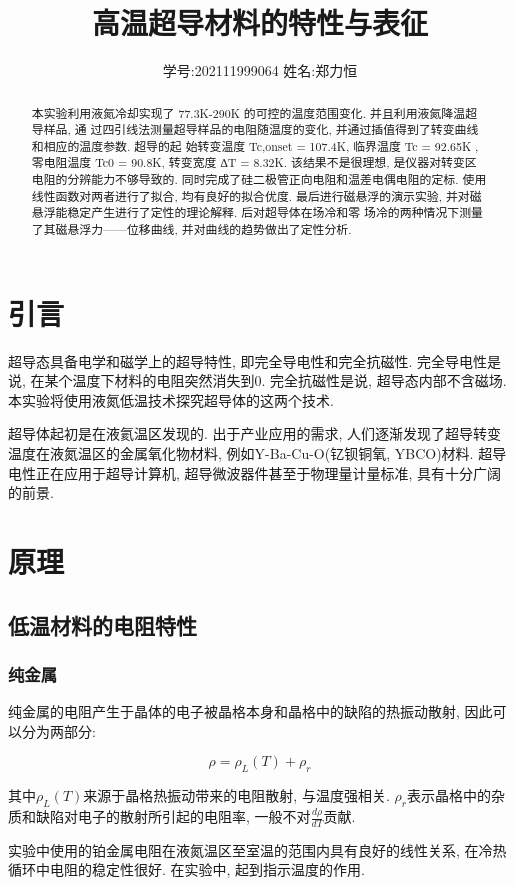 \documentclass[12pt,a4paper]{article}
\title{\vspace{-4cm}\Large 高温超导材料的特性与表征}  %
\author{\kaishu 学号:202111999064 \hspace{2cm} 姓名:郑力恒}   %
\date{}
\newcommand{\be}[1]{
    \begin{equation}
        #1
    \end{equation}
}
\begin{document}
\maketitle

\begin{abstract}
    本实验利用液氮冷却实现了 77.3K-290K 的可控的温度范围变化. 并且利用液氮降温超导样品, 通
    过四引线法测量超导样品的电阻随温度的变化, 并通过插值得到了转变曲线和相应的温度参数. 超导的起
    始转变温度 Tc,onset = 107.4K, 临界温度 Tc = 92.65K , 零电阻温度 Tc0 = 90.8K, 转变宽度 ∆T = 8.32K. 该结果不是很理想, 是仪器对转变区电阻的分辨能力不够导致的. 
    同时完成了硅二极管正向电阻和温差电偶电阻的定标. 使用线性函数对两者进行了拟合, 均有良好的拟合优度. 
    最后进行磁悬浮的演示实验, 并对磁悬浮能稳定产生进行了定性的理论解释. 后对超导体在场冷和零
    场冷的两种情况下测量了其磁悬浮力——位移曲线, 并对曲线的趋势做出了定性分析.
    
\end{abstract}

\section{引言}
超导态具备电学和磁学上的超导特性, 即完全导电性和完全抗磁性. 完全导电性是说, 在某个温度下材料的电阻突然消失到0. 完全抗磁性是说, 超导态内部不含磁场. 
本实验将使用液氮低温技术探究超导体的这两个技术. 

超导体起初是在液氦温区发现的. 出于产业应用的需求, 人们逐渐发现了超导转变温度在液氮温区的金属氧化物材料, 例如Y-Ba-Cu-O(钇钡铜氧, YBCO)材料. 超导电性正在应用于超导计算机, 超导微波器件甚至于物理量计量标准, 具有十分广阔的前景. 

\section{原理}
\subsection{低温材料的电阻特性}
\subsubsection{纯金属}
纯金属的电阻产生于晶体的电子被晶格本身和晶格中的缺陷的热振动散射, 因此可以分为两部分:
\be{\rho=\rho_{L}(T)+\rho_{r}}
其中$\rho_{L}(T)$来源于晶格热振动带来的电阻散射, 与温度强相关. $\rho_r$表示晶格中的杂质和缺陷对电子的散射所引起的电阻率, 一般不对$\frac{d\rho}{dT}$贡献. 

实验中使用的铂金属电阻在液氮温区至室温的范围内具有良好的线性关系, 在冷热循环中电阻的稳定性很好. 在实验中, 起到指示温度的作用. 
\end{document}
